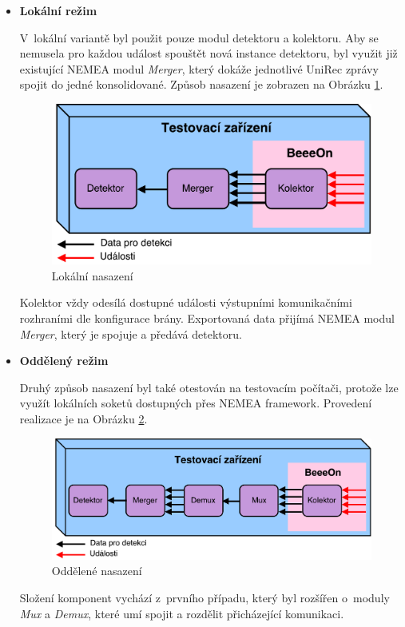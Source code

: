  \begin{itemize}
  \item \textbf{Lokální režim}
  
  V~lokální variantě byl použit pouze modul detektoru a kolektoru. Aby se nemusela pro každou 
  událost spouštět nová instance detektoru, byl využit již existující NEMEA modul \textit{Merger},
  který 
  dokáže jednotlivé UniRec zprávy spojit do jedné konsolidované. Způsob nasazení je zobrazen na Obrázku 
  \ref{obr.option1}.
  
  \begin{figure}[ht]
   \begin{center}
   \includegraphics[scale=0.5]{pictures/deploy-option1}
   \caption{Lokální nasazení}
   \label{obr.option1}
   \end{center}
   \end{figure}
   
   Kolektor vždy odesílá dostupné události výstupními komunikačními rozhraními
   dle konfigurace brány.
   Exportovaná data přijímá NEMEA modul \textit{Merger}, který je spojuje a předává detektoru.
   
  \item \textbf{Oddělený režim} \label{externalMode}
  
  Druhý způsob nasazení byl také otestován na testovacím počítači, protože lze využít lokálních
  soketů dostupných přes NEMEA framework. Provedení realizace je na Obrázku \ref{obr.option2}.
 
  \begin{figure}[ht]
   \begin{center}
   \includegraphics[scale=0.5]{pictures/deploy-option2}
   \caption{Oddělené nasazení}
   \label{obr.option2}
   \end{center}
   \end{figure}
   
   Složení komponent vychází z~prvního případu, který byl rozšířen o~moduly \textit{Mux} a 
   \textit{Demux}, které 
   umí spojit a rozdělit přicházející komunikaci.
 \end{itemize}
 
